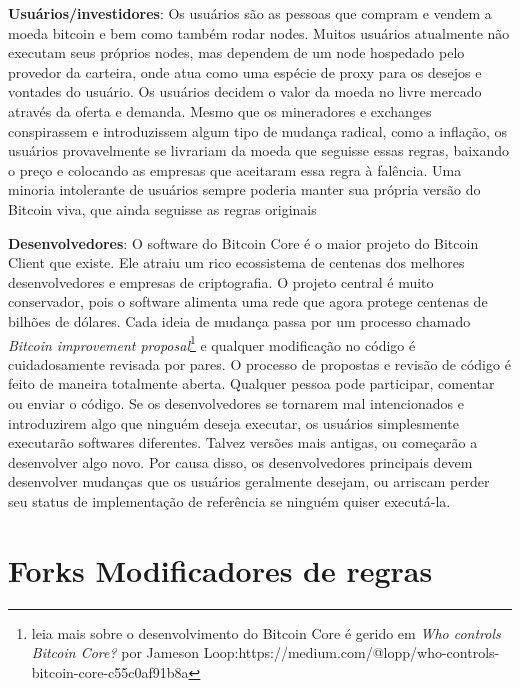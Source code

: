 \textbf{Usuários/investidores}: Os usuários são as pessoas que compram e vendem a moeda bitcoin e bem como também rodar nodes.
Muitos usuários atualmente não executam seus próprios nodes, mas dependem de um node hospedado pelo provedor da carteira, onde atua como uma espécie de proxy para os desejos e vontades do usuário. 
Os usuários decidem o valor da moeda no livre mercado através da oferta e demanda.
Mesmo que os mineradores e exchanges %
conspirassem e introduzissem algum tipo de mudança radical, como a inflação, os usuários provavelmente se livrariam da moeda que seguisse essas regras, baixando o preço e colocando as empresas que aceitaram essa regra à falência. 
Uma minoria intolerante de usuários sempre poderia manter sua própria versão do Bitcoin viva, que ainda seguisse as regras originais

\textbf{Desenvolvedores}: O software do Bitcoin Core é o maior projeto do Bitcoin Client que existe.
Ele atraiu um rico ecossistema de centenas dos melhores desenvolvedores e empresas de criptografia.
O projeto central é muito conservador, pois o software alimenta uma rede que agora protege centenas de bilhões de dólares.
Cada ideia de mudança passa por um processo chamado \textit{Bitcoin improvement proposal}\footnote{leia mais sobre o desenvolvimento do Bitcoin Core é gerido em \textit{Who controls Bitcoin Core?} por Jameson Loop:https://medium.com/@lopp/who-controls-bitcoin-core-c55c0af91b8a} e qualquer modificação no código é cuidadosamente revisada por pares. %
 O processo de propostas e revisão de código é feito de maneira  totalmente aberta. 
 Qualquer pessoa pode participar, comentar ou enviar o código. 
 Se os desenvolvedores se tornarem mal intencionados e introduzirem algo que ninguém deseja executar, os usuários simplesmente executarão softwares diferentes. 
 Talvez versões mais antigas, ou começarão a desenvolver algo novo. 
 Por causa disso, os desenvolvedores principais devem desenvolver mudanças que os usuários geralmente desejam, ou arriscam perder seu status de implementação de referência se ninguém quiser executá-la.

\section*{Forks Modificadores de regras}

